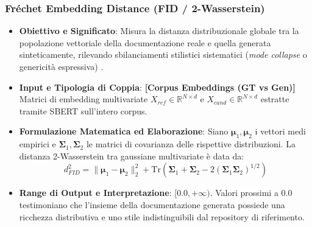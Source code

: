 \subsubsection{Fréchet Embedding Distance (FID / 2-Wasserstein)}
\label{subsubsec:fid}
\begin{itemize}[leftmargin=*, label=\textbullet]
    \item \textbf{Obiettivo e Significato}: Misura la distanza distribuzionale globale tra la popolazione vettoriale della documentazione reale e quella generata sinteticamente, rilevando sbilanciamenti stilistici sistematici (\emph{mode collapse} o genericità espressiva) \cite{dowson_frechet_1982}.
    \item \textbf{Input e Tipologia di Coppia}: \textbf{[Corpus Embeddings (GT vs Gen)]} Matrici di embedding multivariate $X_{ref} \in \mathbb{R}^{N \times d}$ e $X_{cand} \in \mathbb{R}^{N \times d}$ estratte tramite SBERT sull'intero corpus.
    \item \textbf{Formulazione Matematica ed Elaborazione}: Siano $\boldsymbol{\mu}_1, \boldsymbol{\mu}_2$ i vettori medi empirici e $\boldsymbol{\Sigma}_1, \boldsymbol{\Sigma}_2$ le matrici di covarianza delle rispettive distribuzioni. La distanza 2-Wasserstein tra gaussiane multivariate è data da:
    \begin{equation}
        d_{FID}^2 = \|\boldsymbol{\mu}_1 - \boldsymbol{\mu}_2\|_2^2 + \text{Tr}\left(\boldsymbol{\Sigma}_1 + \boldsymbol{\Sigma}_2 - 2(\boldsymbol{\Sigma}_1 \boldsymbol{\Sigma}_2)^{1/2}\right)
        \label{eq:fid_formula}
    \end{equation}
    \item \textbf{Range di Output e Interpretazione}: $[0.0, +\infty)$. Valori prossimi a $0.0$ testimoniano che l'insieme della documentazione generata possiede una ricchezza distributiva e uno stile indistinguibili dal repository di riferimento.
\end{itemize}

